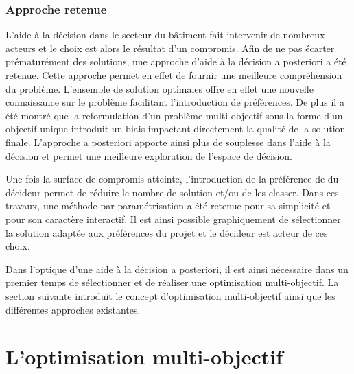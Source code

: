 

\subsubsection{Approche retenue} %
\label{ssub:approche_retenue}
L’aide à la décision dans le secteur du bâtiment fait intervenir de nombreux acteurs
et le choix est alors le résultat d’un compromis. Afin de ne pas écarter prématurément
des solutions, une approche d’aide à la décision a posteriori a été retenue. Cette approche
permet en effet de fournir une meilleure compréhension du problème. L’ensemble
de solution optimales offre en effet une nouvelle connaissance sur le problème
facilitant l’introduction de préférences.
De plus il a été montré que la reformulation d’un problème multi-objectif sous la
forme d’un objectif unique introduit un biais impactant directement la qualité de
la solution finale. L’approche a posteriori apporte ainsi plus de souplesse dans
l’aide à la décision et permet une meilleure exploration de l’espace de décision.

Une fois la surface de compromis atteinte, l’introduction de la préférence de
du décideur permet de réduire le nombre de solution et/ou de les classer.
Dans ces travaux, une méthode par paramétrisation a été retenue pour sa simplicité
et pour son caractère interactif. Il est ainsi possible graphiquement de sélectionner
la solution adaptée aux préférences du projet et le décideur est acteur de ces choix.

Dans l’optique d’une aide à la décision a posteriori, il est ainsi nécessaire
dans un premier temps de sélectionner et de réaliser une optimisation multi-objectif.
La section suivante introduit le concept d’optimisation multi-objectif ainsi que
les différentes approches existantes.




\section{L’optimisation multi-objectif} %
\label{sec:l_optimisation_multi_objectif}
